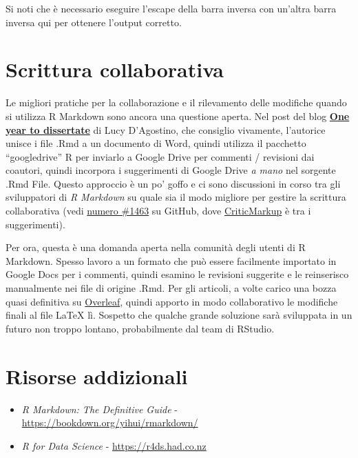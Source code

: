 \documentclass[a4paper, 11pt, nobind]{templates/ociamthesis}
\begin{document}
Si noti che è necessario eseguire l'escape della barra inversa con un'altra barra inversa qui per ottenere l'output corretto.

\hypertarget{scrittura-collaborativa}{%
\section{Scrittura collaborativa}\label{scrittura-collaborativa}}

Le migliori pratiche per la collaborazione e il rilevamento delle modifiche quando si utilizza R Markdown sono ancora una questione aperta.
Nel post del blog \href{https://livefreeordichotomize.com/2018/09/14/one-year-to-dissertate/}{\textbf{One year to dissertate}} di Lucy D'Agostino, che consiglio vivamente, l'autorice unisce i file .Rmd a un documento di Word, quindi utilizza il pacchetto ``googledrive'' R per inviarlo a Google Drive per commenti / revisioni dai coautori, quindi incorpora i suggerimenti di Google Drive \emph{a mano} nel sorgente .Rmd File.
Questo approccio è un po' goffo e ci sono discussioni in corso tra gli sviluppatori di \emph{R Markdown} su quale sia il modo migliore per gestire la scrittura collaborativa (vedi \href{https://github.com/rstudio/rmarkdown/issues/1463}{numero \#1463} su GitHub, dove \href{http://criticmarkup.com}{CriticMarkup} è tra i suggerimenti).

Per ora, questa è una domanda aperta nella comunità degli utenti di R Markdown.
Spesso lavoro a un formato che può essere facilmente importato in Google Docs per i commenti, quindi esamino le revisioni suggerite e le reinserisco manualmente nei file di origine .Rmd.
Per gli articoli, a volte carico una bozza quasi definitiva su \href{https://www.overleaf.com/}{Overleaf}, quindi apporto in modo collaborativo le modifiche finali al file LaTeX lì.
Sospetto che qualche grande soluzione sarà sviluppata in un futuro non troppo lontano, probabilmente dal team di RStudio.

\hypertarget{risorse-addizionali}{%
\section{Risorse addizionali}\label{risorse-addizionali}}

\begin{itemize}
\item
  \emph{R Markdown: The Definitive Guide} - \url{https://bookdown.org/yihui/rmarkdown/}
\item
  \emph{R for Data Science} - \url{https://r4ds.had.co.nz}
\end{itemize}
\end{document}
